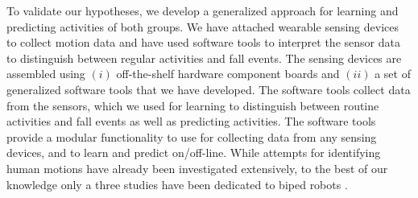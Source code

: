 \documentclass{IEEEtran}
\begin{document}
\par


To validate our hypotheses, we develop a generalized approach for learning 
and predicting activities of both groups.  We have attached wearable sensing devices to collect 
motion data and have used software tools to interpret the sensor data to distinguish 
between regular activities and fall events. The sensing devices are assembled using $(i)$ off-the-shelf 
hardware component boards and $(ii)$  a set of generalized software tools that we have developed. The software tools 
collect data  from the sensors, which we used for learning to distinguish between routine activities and fall events as well as predicting activities. The software tools provide a modular 
functionality to use for collecting  data from any sensing devices, and to learn and predict 
on/off-line. While attempts for identifying human motions have already been investigated extensively, to the 
best of our knowledge only a three studies have been dedicated to biped robots \cite{Andre2015,Goswami2014,Moya2015}. 

%



\end{document}
